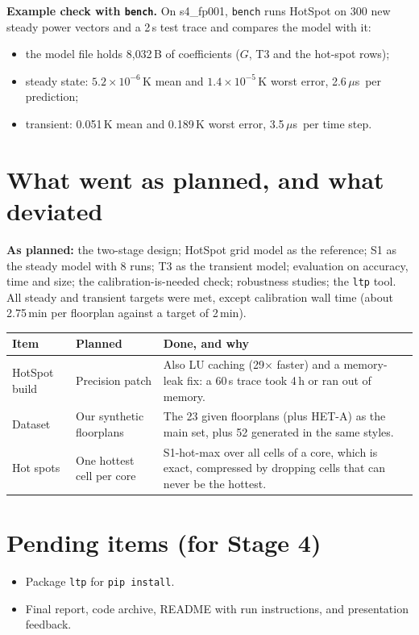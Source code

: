 \documentclass[11pt,a4paper]{article}
\newcommand{\us}{\,$\mu$s}
\begin{document}
\textbf{Example check with \texttt{bench}.} On s4\_fp001, \texttt{bench} runs HotSpot on 300 new
steady power vectors and a 2\,s test trace and compares the model with it:
\begin{itemize}
  \item the model file holds 8{,}032\,B of coefficients ($G$, T3 and the hot-spot rows);
  \item steady state: $5.2\times10^{-6}$\,K mean and $1.4\times10^{-5}$\,K worst error, 2.6\us\
        per prediction;
  \item transient: 0.051\,K mean and 0.189\,K worst error, 3.5\us\ per time step.
\end{itemize}

\section{What went as planned, and what deviated}
\textbf{As planned:} the two-stage design; HotSpot grid model as the reference; S1 as the steady
model with 8 runs; T3 as the transient model; evaluation on accuracy, time and size; the
calibration-is-needed check; robustness studies; the \texttt{ltp} tool. All steady and transient
targets were met, except calibration wall time (about 2.75\,min per floorplan against a target of
2\,min).

\begin{center}
\small
\begin{tabular}{@{}p{3cm} p{4.3cm} p{7.7cm}@{}}
\toprule
Item & Planned & Done, and why \\
\midrule
HotSpot build & Precision patch & Also LU caching (29$\times$ faster) and a memory-leak fix: a 60\,s trace took 4\,h or ran out of memory. \\
Dataset & Our synthetic floorplans & The 23 given floorplans (plus HET-A) as the main set, plus 52 generated in the same styles. \\
Hot spots & One hottest cell per core & S1-hot-max over all cells of a core, which is exact, compressed by dropping cells that can never be the hottest. \\
\bottomrule
\end{tabular}
\end{center}

\section{Pending items (for Stage 4)}
\begin{itemize}
  \item Package \texttt{ltp} for \texttt{pip install}.
  \item Final report, code archive, README with run instructions, and presentation feedback.
\end{itemize}
\end{document}
